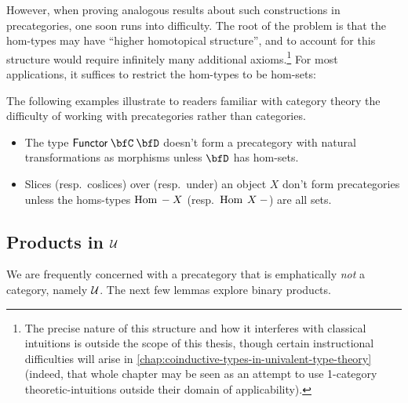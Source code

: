 \documentclass[a5paper]{article}
\begin{document}
However, when proving analogous results about such constructions in
precategories, one soon runs into difficulty. The
root of the problem is that the hom-types may have ``higher homotopical
structure'', and to account for this structure would require infinitely many
additional axioms.\footnote{The precise nature of this structure and how it
  interferes with classical intuitions is outside the scope of this thesis,
  though certain instructional difficulties will arise in
  \cref{chap:coinductive-types-in-univalent-type-theory} (indeed, that whole
  chapter may be seen as an attempt to use 1-category theoretic-intuitions
  outside their domain of applicability).} 
For most applications, it suffices to restrict the hom-types to be hom-sets:

\begin{example}
  The following examples illustrate to readers familiar with category theory the
  difficulty of working with precategories rather than categories. 
  \begin{itemize}
    \itemsep0em
    \item The type $\appply{\Functor}{\bfC}{\bfD}$ doesn't form a precategory
      with natural transformations as morphisms unless $\bfD$ has hom-sets. 
    \item Slices (resp.\ coslices) over (resp.\ under) an object $X$ don't form
      precategories unless the homs-types $\operatorname{Hom}\hspace{0.23em} - \hspace{0.23em} X$ (resp.\
      $\operatorname{Hom}\hspace{0.23em} X \hspace{0.23em} -$) are all sets.
  \end{itemize}
\end{example}

\subsection{Products in $\mathcal{U}$}
\label{subsec:products-in-universe}

We are frequently concerned with a precategory that is emphatically \textit{not}
a category, namely $\mathcal{U}$. The next few lemmas explore binary products.
\end{document}
